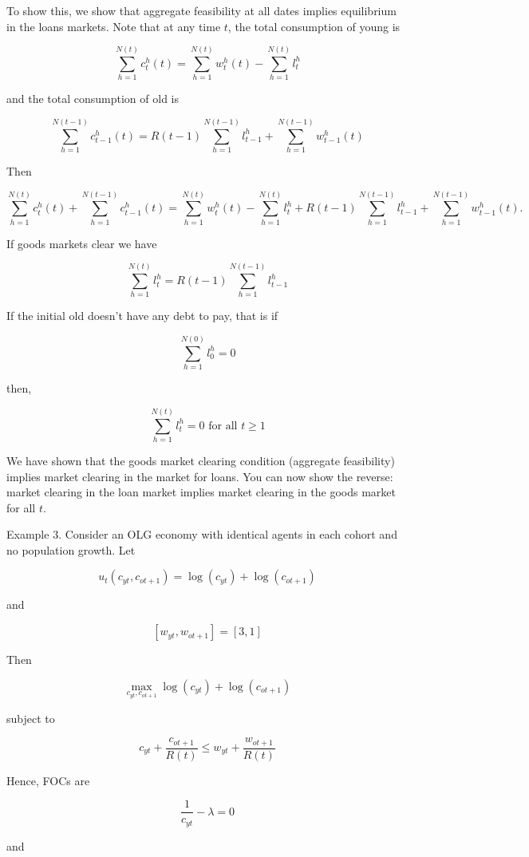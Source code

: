 \documentclass[10pt]{article}
\begin{document}
To show this, we show that aggregate feasibility at all dates implies equilibrium in the loans markets. Note that at any time $t$, the total consumption of young is

$$
\sum_{h=1}^{N(t)} c_{t}^{h}(t)=\sum_{h=1}^{N(t)} w_{t}^{h}(t)-\sum_{h=1}^{N(t)} l_{t}^{h}
$$

and the total consumption of old is

$$
\sum_{h=1}^{N(t-1)} c_{t-1}^{h}(t)=R(t-1) \sum_{h=1}^{N(t-1)} l_{t-1}^{h}+\sum_{h=1}^{N(t-1)} w_{t-1}^{h}(t)
$$

Then

$$
\sum_{h=1}^{N(t)} c_{t}^{h}(t)+\sum_{h=1}^{N(t-1)} c_{t-1}^{h}(t)=\sum_{h=1}^{N(t)} w_{t}^{h}(t)-\sum_{h=1}^{N(t)} l_{t}^{h}+R(t-1) \sum_{h=1}^{N(t-1)} l_{t-1}^{h}+\sum_{h=1}^{N(t-1)} w_{t-1}^{h}(t) .
$$

If goods markets clear we have

$$
\sum_{h=1}^{N(t)} l_{t}^{h}=R(t-1) \sum_{h=1}^{N(t-1)} l_{t-1}^{h}
$$

If the initial old doesn't have any debt to pay, that is if

$$
\sum_{h=1}^{N(0)} l_{0}^{h}=0
$$

then,

$$
\sum_{h=1}^{N(t)} l_{t}^{h}=0 \text { for all } t \geq 1
$$

We have shown that the goods market clearing condition (aggregate feasibility) implies market clearing in the market for loans. You can now show the reverse: market clearing in the loan market implies market clearing in the goods market for all $t$.

Example 3. Consider an OLG economy with identical agents in each cohort and no population growth. Let

$$
u_{t}\left(c_{y t}, c_{o t+1}\right)=\log \left(c_{y t}\right)+\log \left(c_{o t+1}\right)
$$

and

$$
\left[w_{y t}, w_{o t+1}\right]=[3,1]
$$

Then

$$
\max _{c_{y t}, c_{o t+1}} \log \left(c_{y t}\right)+\log \left(c_{o t+1}\right)
$$

subject to

$$
c_{y t}+\frac{c_{o t+1}}{R(t)} \leq w_{y t}+\frac{w_{o t+1}}{R(t)}
$$

Hence, FOCs are

$$
\frac{1}{c_{y t}}-\lambda=0
$$

and
\end{document}
